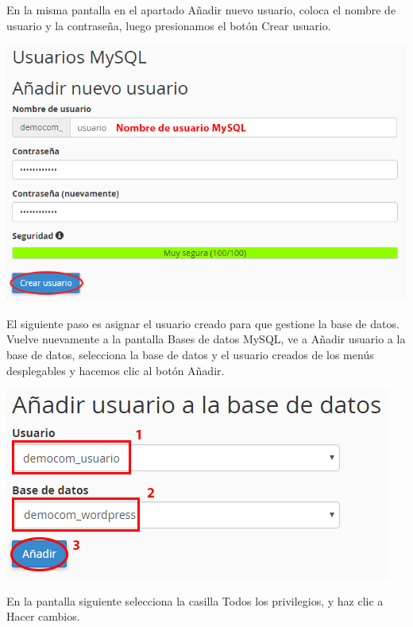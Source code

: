 \begin{enumerate}
		\newpage
		
		En la misma pantalla en el apartado Añadir nuevo usuario, coloca el nombre de usuario y la contraseña, luego presionamos el botón Crear usuario.
		
		\begin{center}
			\includegraphics[scale=0.4]{image/migra11.png}
		\end{center}
		
		El siguiente paso es asignar el usuario creado para que gestione la base de datos.\\
		
		Vuelve nuevamente a la pantalla Bases de datos MySQL, ve a  Añadir usuario a la base de datos, selecciona la base de datos y el usuario creados de los menús desplegables y hacemos clic al botón Añadir.
		
		\begin{center}
			\includegraphics[scale=0.5]{image/migra12.png}
		\end{center}
		
		\newpage
		
		En la pantalla siguiente selecciona la casilla Todos los privilegios, y haz clic a Hacer cambios.
		

\end{enumerate}
